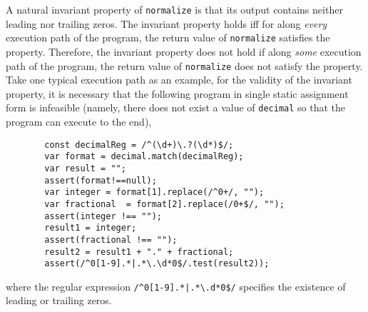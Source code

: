 A natural invariant property of {\tt normalize} is that its output contains neither leading nor trailing zeros. The invariant property holds iff for along \emph{every} execution path of the program, the return value of {\tt normalize} satisfies the property. Therefore, the invariant property does not hold if along \emph{some} execution path of the program, the return value of {\tt normalize} does not satisfy the property. Take one typical execution path as an example, for the validity of the invariant property, it is necessary that the following program in single static assignment form is infeasible (namely, there does not exist a value of {\tt decimal} so that the program can execute to the end), 
\begin{figure}[htbp]
\begin{center}
\begin{verbatim}
  const decimalReg = /^(\d+)\.?(\d*)$/;
  var format = decimal.match(decimalReg);
  var result = "";
  assert(format!==null);
  var integer = format[1].replace(/^0+/, "");
  var fractional  = format[2].replace(/0+$/, "");
  assert(integer !== ""); 
  result1 = integer;
  assert(fractional !== ""); 
  result2 = result1 + "." + fractional;
  assert(/^0[1-9].*|.*\.\d*0$/.test(result2));
\end{verbatim}
\end{center}
\label{fig-run-exmp-path}
\end{figure}
where the regular expression {\tt /\^{}0[1-9].*|.*{\footnotesize\textbackslash}.d*0\$/} specifies the existence of leading or trailing zeros.

